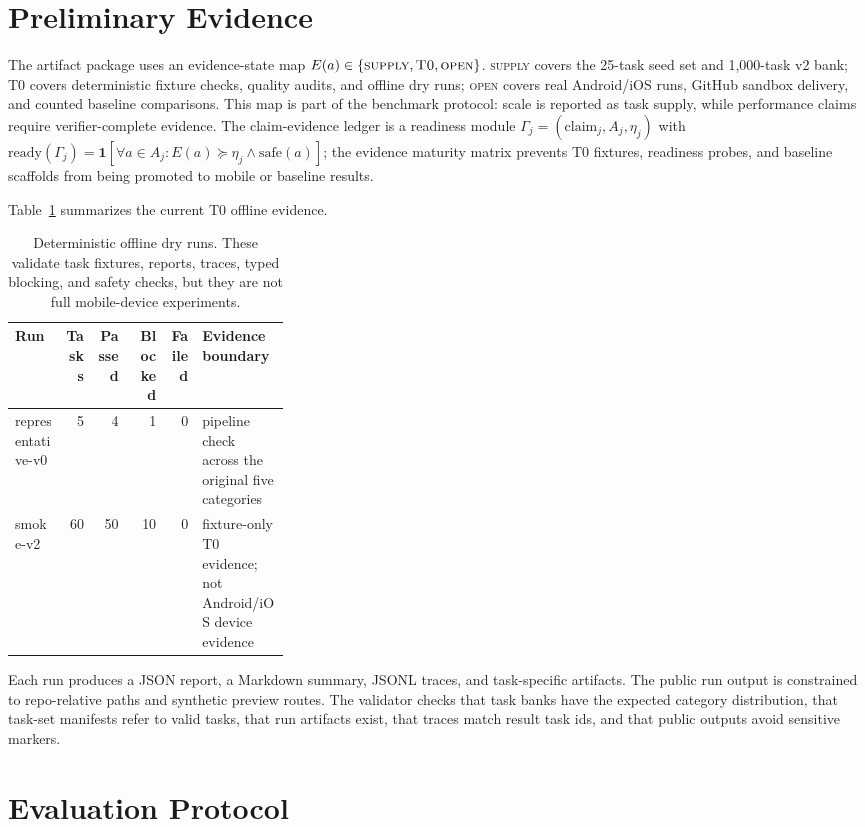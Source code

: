 \documentclass{article}
\begin{document}
\section{Preliminary Evidence}

The artifact package uses an evidence-state map \(E(a)\in\{\textsc{supply},\textsc{T0},\textsc{open}\}\).
\textsc{supply} covers the 25-task seed set and 1,000-task v2 bank; \textsc{T0} covers deterministic fixture checks, quality audits, and offline dry runs; \textsc{open} covers real Android/iOS runs, GitHub sandbox delivery, and counted baseline comparisons.
This map is part of the benchmark protocol: scale is reported as task supply, while performance claims require verifier-complete evidence.
The claim-evidence ledger is a readiness module \(\Gamma_j=(\mathrm{claim}_j,A_j,\eta_j)\) with \(\mathrm{ready}(\Gamma_j)=\mathbf{1}[\forall a\in A_j:E(a)\succeq\eta_j\land\mathrm{safe}(a)]\); the evidence maturity matrix prevents T0 fixtures, readiness probes, and baseline scaffolds from being promoted to mobile or baseline results.

Table~\ref{tab:dryrun} summarizes the current T0 offline evidence.

\begin{table}[t]
\centering
\small
\begin{tabular}{lrrrrp{0.32\linewidth}}
\toprule
Run & Tasks & Passed & Blocked & Failed & Evidence boundary \\
\midrule
representative-v0 & 5 & 4 & 1 & 0 & pipeline check across the original five categories \\
smoke-v2 & 60 & 50 & 10 & 0 & fixture-only T0 evidence; not Android/iOS device evidence \\
\bottomrule
\end{tabular}
\caption{Deterministic offline dry runs. These validate task fixtures, reports, traces, typed blocking, and safety checks, but they are not full mobile-device experiments.}
\label{tab:dryrun}
\end{table}

Each run produces a JSON report, a Markdown summary, JSONL traces, and task-specific artifacts.
The public run output is constrained to repo-relative paths and synthetic preview routes.
The validator checks that task banks have the expected category distribution, that task-set manifests refer to valid tasks, that run artifacts exist, that traces match result task ids, and that public outputs avoid sensitive markers.

\section{Evaluation Protocol}
\end{document}
